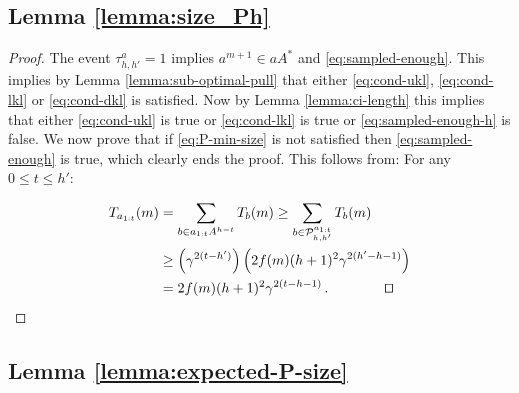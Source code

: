 \documentclass[runningheads, envcountsame, a4paper]{llncs}
\begin{document}
\subsection{Lemma \ref{lemma:size_Ph}}
\begin{proof}
The event $\tau^a_{h,h'}=1$ implies $a^{m+1}\in a A^*$ and \eqref{eq:sampled-enough}. This implies by Lemma \ref{lemma:sub-optimal-pull} that either \eqref{eq:cond-ukl}, \eqref{eq:cond-lkl} or \eqref{eq:cond-dkl} is satisfied. Now by Lemma \ref{lemma:ci-length} this implies that either \eqref{eq:cond-ukl} is true or \eqref{eq:cond-lkl} is true or \eqref{eq:sampled-enough-h} is false. We now prove that if \eqref{eq:P-min-size} is not satisfied then \eqref{eq:sampled-enough} is true, which clearly ends the proof.
This follows from: For any $0 \leq t \leq h'$:

\begin{align*}
    T_{a_{1:t}}(m) &= \sum_{b\in a_{1:t}A^{h-t}} T_b(m) \geq \sum_{b\in \mathcal{P}^{a_{1:t}}_{h,h'}} T_b(m) \\
    &\geq \left(\gamma^{2(t-h')}\right) \left(2f(m)(h+1)^2\gamma^{2(h'-h-1)}\right)\\
    &= 2f(m)(h+1)^2\gamma^{2(t-h-1)}\,.\qquad\qquad\qed
\end{align*}
\end{proof}

\subsection{Lemma \ref{lemma:expected-P-size}}
\end{document}
